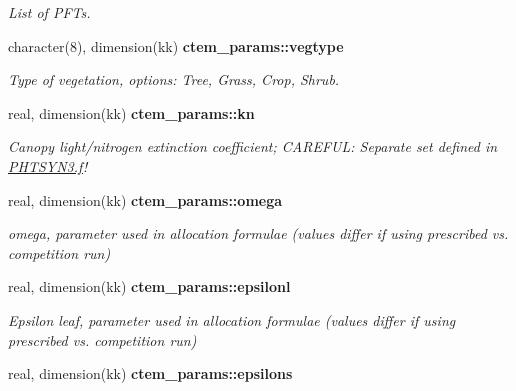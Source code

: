\begin{DoxyCompactItemize}
\begin{DoxyCompactList}\small\item\em List of P\+F\+Ts. \end{DoxyCompactList}\item 
\hypertarget{namespacectem__params_abbdfc712bc0900b4c823c6248180d0db}{}character(8), dimension(kk) {\bfseries ctem\+\_\+params\+::vegtype}\label{namespacectem__params_abbdfc712bc0900b4c823c6248180d0db}

\begin{DoxyCompactList}\small\item\em Type of vegetation, options\+: Tree, Grass, Crop, Shrub. \end{DoxyCompactList}\item 
\hypertarget{namespacectem__params_a3a1fb11af516cf3daa780402bdbde953}{}real, dimension(kk) {\bfseries ctem\+\_\+params\+::kn}\label{namespacectem__params_a3a1fb11af516cf3daa780402bdbde953}

\begin{DoxyCompactList}\small\item\em Canopy light/nitrogen extinction coefficient; C\+A\+R\+E\+F\+U\+L\+: Separate set defined in \hyperlink{PHTSYN3_8f}{P\+H\+T\+S\+Y\+N3.\+f}! \end{DoxyCompactList}\item 
\hypertarget{namespacectem__params_a632738827e870757c4538eb8abd3ba18}{}real, dimension(kk) {\bfseries ctem\+\_\+params\+::omega}\label{namespacectem__params_a632738827e870757c4538eb8abd3ba18}

\begin{DoxyCompactList}\small\item\em omega, parameter used in allocation formulae (values differ if using prescribed vs. competition run) \end{DoxyCompactList}\item 
\hypertarget{namespacectem__params_a555429920f02dff7239a96256af1a0eb}{}real, dimension(kk) {\bfseries ctem\+\_\+params\+::epsilonl}\label{namespacectem__params_a555429920f02dff7239a96256af1a0eb}

\begin{DoxyCompactList}\small\item\em Epsilon leaf, parameter used in allocation formulae (values differ if using prescribed vs. competition run) \end{DoxyCompactList}\item 
\hypertarget{namespacectem__params_ae5c289e0db08b110ab093ab912b1955b}{}real, dimension(kk) {\bfseries ctem\+\_\+params\+::epsilons}\label{namespacectem__params_ae5c289e0db08b110ab093ab912b1955b}


\end{DoxyCompactItemize}
